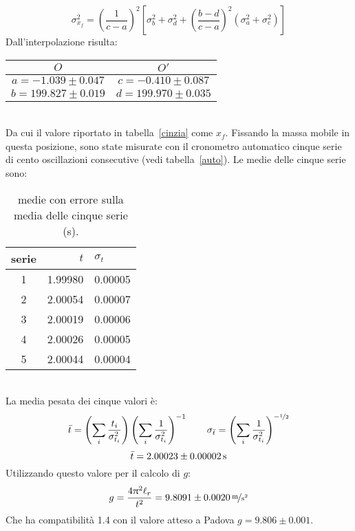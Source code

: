 \documentclass[italian,a4paper]{article}
\renewcommand{\pi}{\uppi} %
\begin{document}
\begin{equation*}
 \sigma_{x_f}^2=\left(\dfrac{1}{c-a}\right)^2\left[\sigma_b^2+\sigma_d^2+\left(\dfrac{b-d}{c-a}\right)^2(\sigma_a^2+\sigma_c^2)\right]
\end{equation*}
Dall'interpolazione risulta:
\begin{table}[h]
\centering
 \begin{tabular}{cc}
  $O$ &  $O'$ \\\hline
$a=-1.039\pm0.047$ & $c=-0.410\pm0.087$\\
$b=199.827\pm0.019$ & $d=199.970\pm0.035$\\
 \end{tabular}
\end{table}\\
Da cui il valore riportato in tabella~\ref{cinzia} come $x_f$. Fissando la massa mobile in questa posizione, sono state misurate con il cronometro automatico cinque serie di cento oscillazioni consecutive (vedi tabella~\ref{auto}). Le medie delle cinque serie sono:
\begin{table}[h]\caption{medie con errore sulla media delle cinque serie (\unit{s}).}\label{medie}
\centering
\begin{tabular}{cr@{$\pm$}l}
 serie & $t$&$\sigma_{t}$\\\hline
 1 & 1.99980&0.00005\\
 2 & 2.00054&0.00007\\
 3 & 2.00019&0.00006\\
 4 & 2.00026&0.00005\\
 5 & 2.00044&0.00004\\
\end{tabular}
\end{table}\\
La media pesata dei cinque valori è:
\begin{equation*}
 \bar{t}=\left(\sum_i \dfrac{t_i}{\sigma_{t_i}^2} \right)\left(\sum_i \dfrac{1}{\sigma_{t_i}^2} \right)^{-1} \qquad \sigma_{\bar{t}} = \left(\sum_i \dfrac{1}{\sigma_{t_i}^2} \right)^{-\nicefrac 1 2}
\end{equation*}
\begin{equation*}
\bar{t} = \unit[2.00023\pm0.00002]{s}\\
\end{equation*}
Utilizzando questo valore per il calcolo di $g$:
\begin{equation*}
g=\frac{4\pi^2\ell_r}{t^2} = \unitfrac[9.8091\pm0.0020]{m}{s^2}
\end{equation*}
Che ha compatibilità 1.4 con il valore atteso a Padova $g=9.806\pm0.001$.
\end{document}
